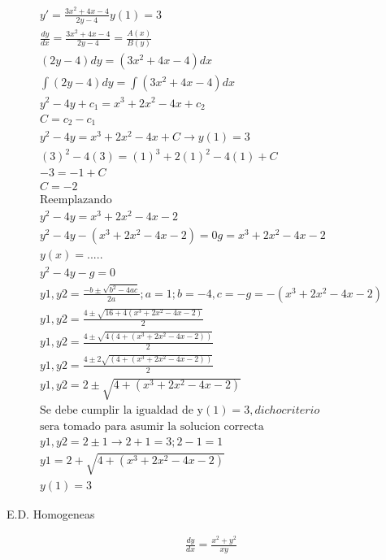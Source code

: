 \documentclass{article}
\begin{document}
\begin{gather*}
y' = \frac{3x^{2}+4x-4}{2y-4}  y(1) = 3 \\
\frac{dy}{dx} = \frac{3x^{2}+4x-4}{2y-4}  = \frac{A(x)}{B(y)} \\
(2y-4)dy =(3x^{2}+4x-4)dx  \\
\int (2y-4)dy =\int (3x^{2}+4x-4)dx \\
y^{2}-4y +c_{1} =x^{3}+2x^{2}-4x + c_{2}  \\
C=c_{2} -c_{1} \\
y^{2}-4y =x^{3}+2x^{2}-4x +C  \rightarrow  y(1) = 3 \\
(3)^{2}-4(3) =(1)^{3}+2(1)^{2}-4(1) +C \\
-3=-1+C \\
C=-2 \\
\text{Reemplazando} \\
y^{2}-4y =x^{3}+2x^{2}-4x -2 \\
y^{2}-4y -(x^{3}+2x^{2}-4x -2)=0    g=x^{3}+2x^{2}-4x -2 \\
y(x) =..... \\
y^{2}-4y-g =0 \\
y1,y2 = \frac{-b±\sqrt{b^{2}-4ac}}{2a}  ;   a=1; b =-4, c =-g=-(x^{3}+2x^{2}-4x -2) \\
y1,y2 = \frac{4±\sqrt{16+4(x^{3}+2x^{2}-4x -2)}}{2} \\
y1,y2 = \frac{4±\sqrt{4(4+(x^{3}+2x^{2}-4x -2))}}{2} \\
y1,y2 = \frac{4±2\sqrt{(4+(x^{3}+2x^{2}-4x -2))}}{2} \\
y1,y2 =2±\sqrt{4+(x^{3}+2x^{2}-4x -2)} \\
\text{Se debe cumplir la igualdad de y}(1) = 3, dicho criterio \\
\text{sera tomado para asumir la solucion correcta} \\
y1,y2 =2±1  \rightarrow  2+1=3; 2-1=1 \\
y1 = 2+\sqrt{4+(x^{3}+2x^{2}-4x -2)} \\
y(1) = 3
\end{gather*}


E.D. Homogeneas


\begin{gather*}
\frac{dy}{dx} = \frac{x^{2}+y^{2}}{xy}
\end{gather*}
\end{document}
